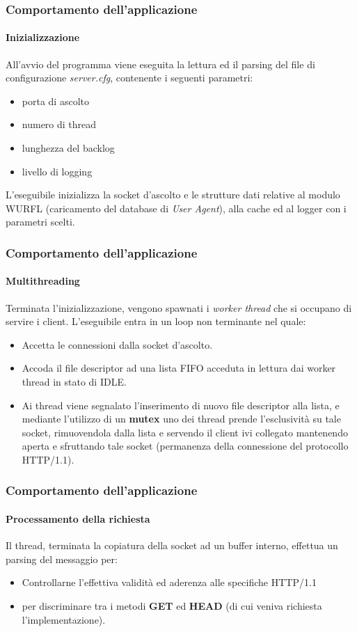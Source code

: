 \documentclass{beamer}
\begin{document}
\begin{frame}
\frametitle{Comportamento dell'applicazione}
\framesubtitle{Inizializzazione}

All'avvio del programma viene eseguita
la lettura ed il parsing del file di configurazione \textit{server.cfg}, contenente i seguenti parametri:

\begin{itemize}
\item porta di ascolto
\item numero di thread
\item lunghezza del backlog
\item livello di logging
\end{itemize}


L’eseguibile inizializza la socket d’ascolto e le strutture dati
relative al modulo WURFL (caricamento del database di \textit{User Agent}), alla cache ed al logger con i parametri scelti.

\end{frame}


\begin{frame}
\frametitle{Comportamento dell'applicazione}
\framesubtitle{Multithreading}

Terminata l’inizializzazione, vengono spawnati i \textit{worker thread} che
si occupano di servire i client. L’eseguibile entra in un loop non terminante nel
quale:

\begin{itemize}
\item Accetta le connessioni dalla socket d’ascolto.
\item Accoda il file descriptor ad una lista FIFO acceduta in lettura dai worker thread in stato
di IDLE.
\item Ai thread viene segnalato l'inserimento di nuovo file descriptor alla lista, e mediante l’utilizzo di un \textbf{mutex} uno dei thread
prende l’esclusività su tale socket,
rimuovendola dalla lista e servendo il client ivi collegato mantenendo aperta e
sfruttando tale socket (permanenza della connessione del protocollo HTTP/1.1).
\end{itemize}

\end{frame}


\begin{frame}
\frametitle{Comportamento dell'applicazione}
\framesubtitle{Processamento della richiesta}

Il thread, terminata la copiatura della socket ad un buffer interno, effettua un
parsing del messaggio per:

\begin{itemize}
\item Controllarne l’effettiva validità ed aderenza alle
specifiche HTTP/1.1

\item per discriminare tra i metodi \textbf{GET} ed \textbf{HEAD} (di cui
veniva richiesta l’implementazione).
\end{itemize}

\end{frame}
\end{document}
